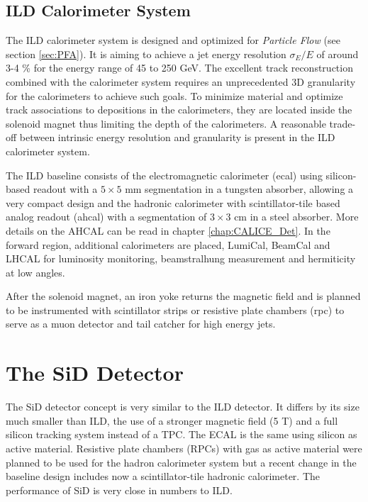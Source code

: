 \subsection{ILD Calorimeter System}

The ILD calorimeter system is designed and optimized for \textit{Particle Flow} (see section \ref{sec:PFA}). It is aiming to achieve a jet energy resolution $\sigma_E/E$ of around 3-4 \% for the energy range of 45 to 250 GeV. The excellent track reconstruction combined with the calorimeter system requires an unprecedented 3D granularity for the calorimeters to achieve such goals. To minimize material and optimize track associations to depositions in the calorimeters, they are located inside the solenoid magnet thus limiting the depth of the calorimeters. A reasonable trade-off between intrinsic energy resolution and granularity is present in the ILD calorimeter system.

The ILD baseline consists of the electromagnetic calorimeter (\acrshort{ecal}) using silicon-bas\-ed readout with a $5 \times 5$ mm segmentation in a tungsten absorber, allowing a very compact design and the hadronic calorimeter with scintillator-tile based analog readout (\acrshort{ahcal}) with a segmentation of $3 \times 3$ cm in a steel absorber. More details on the AHCAL can be read in chapter \ref{chap:CALICE_Det}. In the forward region, additional calorimeters are placed, LumiCal, BeamCal and LHCAL for luminosity monitoring, beamstralhung measurement and hermiticity at low angles.

After the solenoid magnet, an iron yoke returns the magnetic field and is planned to be instrumented with scintillator strips or resistive plate chambers (\acrshort{rpc}) to serve as a muon detector and tail catcher for high energy jets.

\section{The SiD Detector}

The SiD detector concept is very similar to the ILD detector. It differs by its size much smaller than ILD, the use of a stronger magnetic field (5 T) and a full silicon tracking system instead of a TPC. The ECAL is the same using silicon as active material. Resistive plate chambers (RPCs) with gas as active material were planned to be used for the hadron calorimeter system but a recent change in the baseline design includes now a scintillator-tile hadronic calorimeter. The performance of SiD is very close in numbers to ILD.

